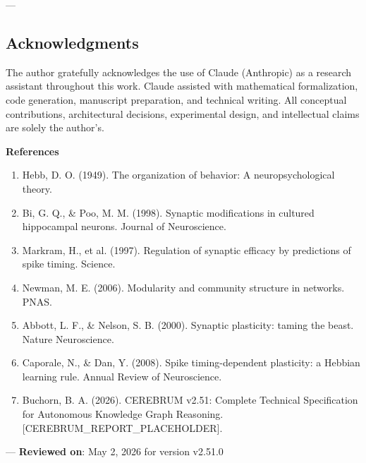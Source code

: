 ---
\subsection{Acknow\-ledgments}

The author gratefully ackno\-wledges the use of Claude (Anthropic) as a research assistant throughout this work. Claude assisted with mathe\-matical forma\-lization, code generation, manuscript preparation, and technical writing. All conceptual contr\-ibutions, archi\-tectural decisions, exper\-imental design, and intel\-lectual claims are solely the author's.

\textbf{References}
\begin{enumerate}
\item Hebb, D. O. (1949). The organ\-ization of behavior: A neuro\-psychological theory.
\item Bi, G. Q., \& Poo, M. M. (1998). Synaptic modif\-ications in cultured hippocampal neurons. Journal of Neuros\-cience.
\item Markram, H., et al. (1997). Regulation of synaptic efficacy by predictions of spike timing. Science.
\item Newman, M. E. (2006). Modularity and community structure in networks. PNAS.
\item Abbott, L. F., \& Nelson, S. B. (2000). Synaptic plasticity: taming the beast. Nature Neuros\-cience.
\item Caporale, N., \& Dan, Y. (2008). Spike timing-dependent plasticity: a Hebbian learning rule. Annual Review of Neuros\-cience.
\item Buchorn, B. A. (2026). CEREBRUM v2.51: Complete Technical Specif\-ication for Autonomous Knowledge Graph Reasoning. [CEREBRUM\_REPORT\_PLACEHOLDER].

\end{enumerate}
---
\textbf{Reviewed on}: May 2, 2026 for version v2.51.0
